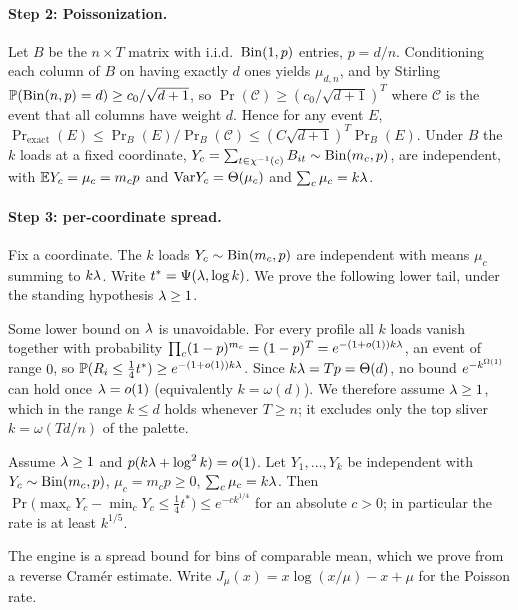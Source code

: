 \paragraph{Step 2: Poissonization.}
Let $B$ be the $n\times T$ matrix with i.i.d.\ $\mathrm{Bin}(1,p)$ entries, $p=d/n$. Conditioning each column of $B$ on having
exactly $d$ ones yields $\mu_{d,n}$, and by Stirling $\mathbb{P}(\mathrm{Bin}(n,p)=d)\ge c_0/\sqrt{d+1}$, so $\Pr(\mathcal C)\ge(c_0/\sqrt{d+1})^T$
where $\mathcal C$ is the event that all columns have weight $d$. Hence for any event $E$,
$\Pr_{\mathrm{exact}}(E)\le\Pr_B(E)/\Pr_B(\mathcal C)\le(C\sqrt{d+1})^T\Pr_B(E)$. Under $B$ the $k$ loads at a fixed
coordinate, $Y_c=\sum_{t\in\chi^{-1}(c)}B_{it}\sim\mathrm{Bin}(m_c,p)$, are independent, with $\mathbb{E} Y_c=\mu_c=m_c p$ and
$\mathrm{Var} Y_c=\Theta(\mu_c)$ and $\sum_c\mu_c=k\lambda$.

\paragraph{Step 3: per-coordinate spread.}
Fix a coordinate. The $k$ loads $Y_c\sim\mathrm{Bin}(m_c,p)$ are independent with means $\mu_c$ summing to $k\lambda$. Write
$t^*=\Psi(\lambda,\log k)$. We prove the following lower tail, under the standing hypothesis $\lambda\ge 1$.

\begin{remark}\label{rem:lam-ge-1}
Some lower bound on $\lambda$ is unavoidable. For every profile all $k$ loads vanish together with probability
$\prod_c(1-p)^{m_c}=(1-p)^T=e^{-(1+o(1))k\lambda}$, an event of range $0$, so $\mathbb{P}(R_i\le\tfrac14 t^*)\ge e^{-(1+o(1))k\lambda}$.
Since $k\lambda=Tp=\Theta(d)$, no bound $e^{-k^{\Omega(1)}}$ can hold once $\lambda=o(1)$ (equivalently $k=\omega(d)$). We therefore
assume $\lambda\ge1$, which in the range $k\le d$ holds whenever $T\ge n$; it excludes only the top sliver $k=\omega(Td/n)$ of
the palette.
\end{remark}

\begin{lemma}\label{lem:occ-spread}
Assume $\lambda\ge1$ and $p(k\lambda+\log^2 k)=o(1)$. Let $Y_1,\dots,Y_k$ be independent with $Y_c\sim\mathrm{Bin}(m_c,p)$, $\mu_c=m_c p\ge0$,
$\sum_c\mu_c=k\lambda$. Then $\Pr\big(\max_c Y_c-\min_c Y_c\le\tfrac14 t^*\big)\le e^{-c k^{1/4}}$ for an absolute $c>0$; in
particular the rate is at least $k^{1/5}$.
\end{lemma}

The engine is a spread bound for bins of comparable mean, which we prove from a reverse Cram\'er estimate. Write
$J_\mu(x)=x\log(x/\mu)-x+\mu$ for the Poisson rate.

